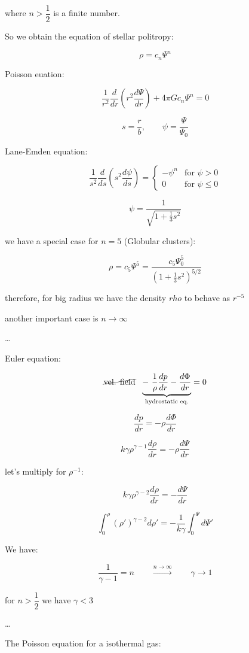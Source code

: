 where $n > \dfrac 12$ is a finite number.

So we obtain the equation of stellar politropy:

$$
\rho = c_n \Psi^n
$$

Poisson euation:

$$
\dfrac 1{r^2} \dfrac{d}{dr} \left( r^2 \dfrac{d \Psi}{dr} \right) + 4 \pi G c_n \Psi^n = 0
$$

$$
s = \dfrac rb, \qquad \psi = \dfrac {\Psi}{\Psi_0}
$$

Lane-Emden equation:

$$
\dfrac 1{s^2} \dfrac{d}{ds} \left( s^2 \dfrac{d \psi}{ds} \right) =
\begin{cases}
    - \psi^n & \text{for } \psi > 0\\
    0 & \text{for } \psi \le 0
\end{cases}
$$

$$
\psi = \dfrac 1{\sqrt{1 + \frac 13 s^2}}
$$

we have a special case for $n = 5$ (Globular clusters):

$$
\rho = c_5 \Psi^5 = \dfrac{ c_5 \Psi_0^5}{\left( 1 + \frac 13 s^2 \right)^{5/2}}
$$

therefore, for big radius we have the density $rho$ to behave as $r^{-5}$

another important case is $n \to \infty$ 

\dots

Euler equation:

$$
\cancel{\text{vel. field}}\ \ \underbrace{- \ \dfrac 1{\rho} \dfrac {dp}{dr} - \dfrac {d \Phi}{dr}}_{\text{hydrostatic eq.}} = 0
$$

$$
\dfrac {dp}{dr} = - \rho \dfrac {d \Phi}{dr}
$$

$$
k \gamma \rho^{\gamma - 1} \dfrac {d \rho}{dr} = - \rho \dfrac {d \Psi}{dr}
$$

let's multiply for $\rho^{-1}$:

$$
k \gamma \rho^{\gamma - 2} \dfrac {d \rho}{dr} = - \dfrac {d \Psi}{dr}
$$

$$
\int_0^\rho (\rho')^{\gamma - 2} d \rho' = - \dfrac 1{k \gamma} \int_0^\Psi d \Psi'
$$

We have:

$$
\dfrac 1{\gamma - 1} = n \qquad \xrightarrow{n \to \infty} \qquad \gamma \to 1
$$

for $n > \dfrac 12$ we have $\gamma < 3$

\dots

The Poisson equation for a isothermal gas:

